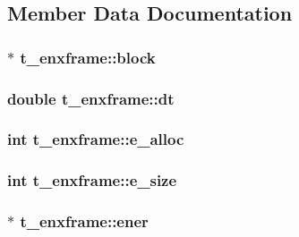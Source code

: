 \subsection{\-Member \-Data \-Documentation}
\hypertarget{structt__enxframe_adbdf5f9d9a396471b3aa5aee44144e3c}{
\subsubsection[{block}]{ $\ast$ {\bf t\-\_\-enxframe\-::block}}}\label{structt__enxframe_adbdf5f9d9a396471b3aa5aee44144e3c}
\hypertarget{structt__enxframe_a695d4e20dc961d0317a9b1a048e69c63}{
\subsubsection[{dt}]{\setlength{\rightskip}{0pt plus 5cm}double {\bf t\-\_\-enxframe\-::dt}}}\label{structt__enxframe_a695d4e20dc961d0317a9b1a048e69c63}
\hypertarget{structt__enxframe_ad9e4fa8f127bb08dca6d322ad7db31af}{
\subsubsection[{e\-\_\-alloc}]{\setlength{\rightskip}{0pt plus 5cm}int {\bf t\-\_\-enxframe\-::e\-\_\-alloc}}}\label{structt__enxframe_ad9e4fa8f127bb08dca6d322ad7db31af}
\hypertarget{structt__enxframe_ae190faa4a8994c8f0d84767739b0ca8a}{
\subsubsection[{e\-\_\-size}]{\setlength{\rightskip}{0pt plus 5cm}int {\bf t\-\_\-enxframe\-::e\-\_\-size}}}\label{structt__enxframe_ae190faa4a8994c8f0d84767739b0ca8a}
\hypertarget{structt__enxframe_a1001463b8aa40fb1e0c227b1f8f1c3f7}{
\subsubsection[{ener}]{ $\ast$ {\bf t\-\_\-enxframe\-::ener}}}\label{structt__enxframe_a1001463b8aa40fb1e0c227b1f8f1c3f7}
